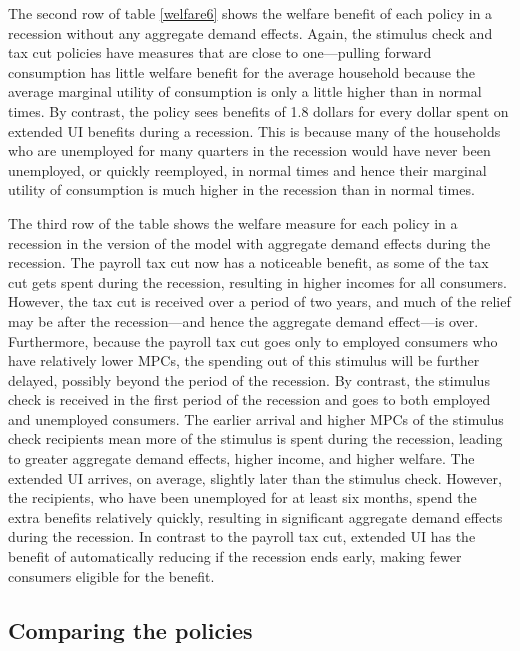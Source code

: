 \documentclass[\econtexRoot/HAFiscal]{subfiles}
\begin{document}
The second row of table \ref{welfare6} shows the welfare benefit of each policy in a recession without any aggregate demand effects. Again, the stimulus check and tax cut policies have measures that are close to one---pulling forward consumption has little welfare benefit for the average household because the average marginal utility of consumption is only a little higher than in normal times. By contrast, the policy sees benefits of 1.8 dollars for every dollar spent on extended UI benefits during a recession. This is because many of the households who are unemployed for many quarters in the recession would have never been unemployed, or quickly reemployed, in normal times and hence their marginal utility of consumption is much higher in the recession than in normal times.

The third row of the table shows the welfare measure for each policy in a recession in the version of the model with aggregate demand effects during the recession. The payroll tax cut now has a noticeable benefit, as some of the tax cut gets spent during the recession, resulting in higher incomes for all consumers. However, the tax cut is received over a period of two years, and much of the relief may be after the recession---and hence the aggregate demand effect---is over. Furthermore, because the payroll tax cut goes only to employed consumers who have relatively lower MPCs, the spending out of this stimulus will be further delayed, possibly beyond the period of the recession. By contrast, the stimulus check is received in the first period of the recession and goes to both employed and unemployed consumers. The earlier arrival and higher MPCs of the stimulus check recipients mean more of the stimulus is spent during the recession, leading to greater aggregate demand effects, higher income, and higher welfare. The extended UI arrives, on average, slightly later than the stimulus check. However, the recipients, who have been unemployed for at least six months, spend the extra benefits relatively quickly, resulting in significant aggregate demand effects during the recession. In contrast to the payroll tax cut, extended UI has the benefit of automatically reducing if the recession ends early, making fewer consumers eligible for the benefit.


\hypertarget{comparing-the-policies}{}\par\subsection{Comparing the policies} 
\end{document}
